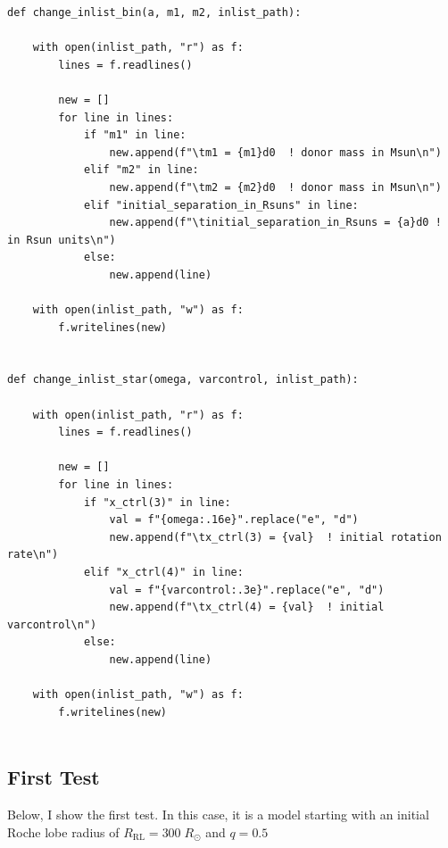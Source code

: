\documentclass[a4paper,10pt]{article}
\begin{document}
\begin{verbatim}
def change_inlist_bin(a, m1, m2, inlist_path):

    with open(inlist_path, "r") as f:
        lines = f.readlines()

        new = []
        for line in lines:
            if "m1" in line:
                new.append(f"\tm1 = {m1}d0  ! donor mass in Msun\n")
            elif "m2" in line:
                new.append(f"\tm2 = {m2}d0  ! donor mass in Msun\n")
            elif "initial_separation_in_Rsuns" in line:
                new.append(f"\tinitial_separation_in_Rsuns = {a}d0 ! in Rsun units\n")
            else:
                new.append(line)

    with open(inlist_path, "w") as f:
        f.writelines(new)


def change_inlist_star(omega, varcontrol, inlist_path):

    with open(inlist_path, "r") as f:
        lines = f.readlines()

        new = []
        for line in lines:
            if "x_ctrl(3)" in line:
                val = f"{omega:.16e}".replace("e", "d")
                new.append(f"\tx_ctrl(3) = {val}  ! initial rotation rate\n")
            elif "x_ctrl(4)" in line:
                val = f"{varcontrol:.3e}".replace("e", "d")
                new.append(f"\tx_ctrl(4) = {val}  ! initial varcontrol\n")
            else:
                new.append(line)

    with open(inlist_path, "w") as f:
        f.writelines(new)


\end{verbatim}


\subsection{First Test}
Below, I show the first test. In this case, it is a model starting with an initial Roche lobe radius of \(R_\text{RL} = 300\;R_\odot \) and \(q=0.5\)
\begin{figure}[ht]
    \centering
\end{figure}
\begin{figure}[ht]
    \centering
\end{figure}
\end{document}
